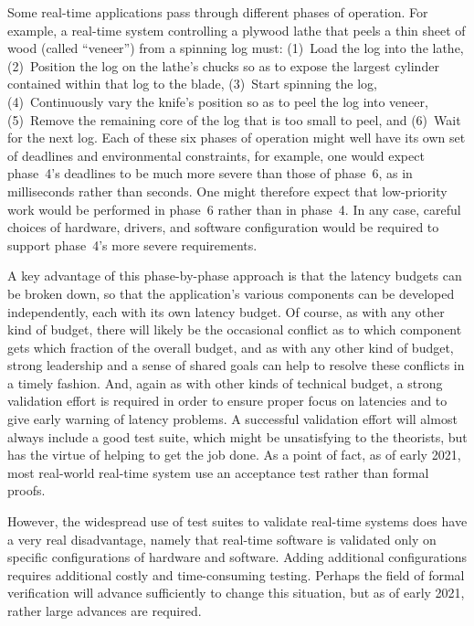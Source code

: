 Some real-time applications pass through different phases of operation.
For example, a real-time system controlling a plywood lathe that peels
a thin sheet of wood (called ``veneer'') from a spinning log must:
(1)~Load the log into the lathe,
(2)~Position the log on the lathe's chucks so as to expose the largest
cylinder contained within that log to the blade,
(3)~Start spinning the log,
(4)~Continuously vary the knife's position so as to peel the log into veneer,
(5)~Remove the remaining core of the log that is too small to peel, and
(6)~Wait for the next log.
Each of these six phases of operation might well have its own set of
deadlines and environmental constraints,
for example, one would expect phase~4's deadlines to be much more severe
than those of phase~6, as in milliseconds rather than seconds.
One might therefore expect that low-priority work would be performed in
phase~6 rather than in phase~4.
In any case, careful choices of hardware, drivers, and software
configuration would be required to support phase~4's more severe
requirements.

A key advantage of this phase-by-phase approach is that the latency
budgets can be broken down, so that the application's various components
can be developed independently, each with its own latency budget.
Of course, as with any other kind of budget, there will likely be the
occasional conflict as to which component gets which fraction of the
overall budget, and as with any other kind of budget, strong leadership
and a sense of shared goals can help to resolve these conflicts in
a timely fashion.
And, again as with other kinds of technical budget, a strong validation
effort is required in order to ensure proper focus on latencies and to
give early warning of latency problems.
A successful validation effort will almost always include a good test
suite, which might be unsatisfying to the theorists, but has the virtue
of helping to get the job done.
As a point of fact, as of early 2021, most real-world real-time system
use an acceptance test rather than formal proofs.

However, the widespread use of test suites to validate real-time systems
does have a very real disadvantage, namely that real-time software is
validated only on specific configurations of hardware and software.
Adding additional configurations requires additional costly and
time-consuming testing.
Perhaps the field of formal verification will advance sufficiently to
change this situation, but as of early 2021, rather
large advances are required.

